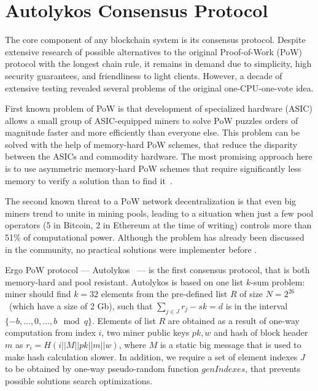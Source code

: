 \section{Autolykos Consensus Protocol}
\label{sec:autolykos}


The core component of any blockchain system is its consensus protocol.
Despite extensive research of possible alternatives to the original Proof-of-Work (PoW) protocol
with the longest chain rule,
it remains in demand due to simplicity, high security guarantees, and friendliness to light clients.
However, a decade of extensive testing revealed several problems of the original one-CPU-one-vote idea.

First known problem of PoW is that development of specialized hardware (ASIC) allows
a small group of ASIC-equipped miners to solve PoW puzzles orders of magnitude faster and more efficiently
than everyone else. This problem can be solved with the help of memory-hard PoW schemes,
that reduce the disparity between the ASICs and commodity hardware. The most promising approach here
is to use asymmetric memory-hard PoW schemes that require significantly less memory
to verify a solution than to find it~\cite{biryukov2017equihash,ethHash}.

The second known threat to a PoW network decentralization is that even big miners trend to unite in
mining pools, leading to a situation when just a few pool operators (5 in Bitcoin, 2 in Ethereum
at the time of writing) controls more than 51\% of computational power.
Although the problem has already been discussed in the community, no practical solutions were
implementer before \Ergo{}.


Ergo PoW protocol --- Autolykos~\cite{Ergopow} --- is the first consensus protocol, that is both memory-hard
and pool resistant.
Autolykos is based on one list $k$-sum problem: miner should find
$k=32$ elements from the pre-defined list $R$ of size $N=2^{26}$~(which have a size of 2 Gb),
such that $\sum_{j \in J} r_{j} - sk = d$ is in the interval $\{-b,\dots,0,\dots,b\mod q\}$.
Elements of list $R$ are obtained as a result of one-way computation from index $i$,
two miner public keys $pk,w$ and hash of block header $m$ as $r_i=H(i||M||pk||m||w)$,
where $M$ is a static big message that is used to make hash calculation slower.
In addition, we require a set of element indexes $J$ to be obtained
by one-way pseudo-random function $genIndexes$, that prevents possible solutions
search optimizations.

